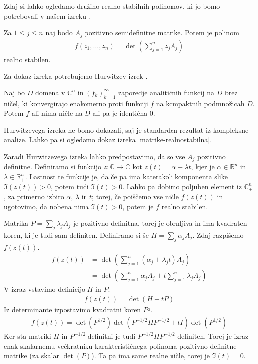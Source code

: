 Zdaj si lahko ogledamo družino realno stabilnih polinomov, ki jo bomo potrebovali v našem izreku \cite{JuliusPetter}.
\begin{izrek}\label{matrike-realnostabilna}
    Za \(1\leq j \leq n\) naj bodo \(A_j\) pozitivno semidefinitne matrike. Potem je polinom
    \begin{align*}
        f(z_1, \ldots, z_n) = \det\left(\sum_{j=1}^n z_j A_j\right)
    \end{align*}
    realno stabilen.
\end{izrek}
Za dokaz izreka potrebujemo Hurwitzev izrek \cite{freitag1}.
\begin{izrek}\label{hurwitz}
    Naj bo \(D\) domena v \(\mathbb C^n\) in \((f_k)_{k=1}^\infty\) zaporedje analitičnih funkcij na \(D\) brez ničel, ki konvergirajo enakomerno proti funkciji \(f\) na kompaktnih podmnožicah \(D\). Potem \(f\) ali nima ničle na \(D\) ali pa je identična \(0\).
\end{izrek}
Hurwitzevega izreka ne bomo dokazali, saj je standarden rezultat iz kompleksne analize. Lahko pa si ogledamo dokaz izreka \ref{matrike-realnostabilna}.
\begin{dokaz}
    Zaradi Hurwitzevega izreka lahko predpostavimo, da so vse \(A_j\) pozitivno definitne. Definiramo si funkcijo \(z: \mathbb C\to \mathbb C\) kot \(z(t) = \alpha + \lambda t\), kjer je \(\alpha\in \mathbb R^n\) in \(\lambda \in \mathbb R_+^n\). Lastnost te funkcije je, da če pa ima katerakoli komponenta slike \(\Im(z(t))>0\), potem tudi \(\Im(t)>0\). Lahko pa dobimo poljuben element iz \(\mathbb C_+^n\), za primerno izbiro \(\alpha\), \(\lambda\) in \(t\); torej, če poiščemo vse ničle \(f(z(t))\) in ugotovimo, da nobena nima \(\Im(t)>0\), potem je \(f\) realno stabilen.

    Matrika \(P = \sum_j \lambda_j A_j\) je pozitivno definitna, torej je obrnljiva in ima kvadraten koren, ki je tudi sam definiten. Definiramo si še \(H = \sum_j \alpha_j A_j\). Zdaj razpišemo \(f(z(t))\).
    \begin{align*}
        f(z(t)) & = \det\left(\sum_{j=1}^n (\alpha_j + \lambda_j t) A_j\right) \\
                & = \det\left(\sum_{j=1}^n \alpha_j A_j + t\sum_{j=1}^n \lambda_j A_j\right)
    \end{align*}
    V izraz vstavimo definicijo \(H\) in \(P\).
    \begin{align*}
        f(z(t))  = \det\left(H+ tP\right)
    \end{align*}
    Iz determinante izpostavimo kvadratni koren \(P^{\frac12}\).
    \begin{align*}
        f(z(t)) = \det\left(P^{1/2}\right)\det\left(P^{-1/2}HP^{-1/2} + tI\right) \det\left(P^{1/2}\right)
    \end{align*}
    Ker sta matriki \(H\) in \(P^{-1/2}\) definitni je tudi \(P^{-1/2}HP^{-1/2}\) definiten. Torej je izraz enak skalarnemu večkratniku karakterističnega polinoma pozitivno definitne matrike (za skalar \(\det(P)\)). Ta pa ima same realne ničle, torej je \(\Im(t)=0\).
\end{dokaz}

